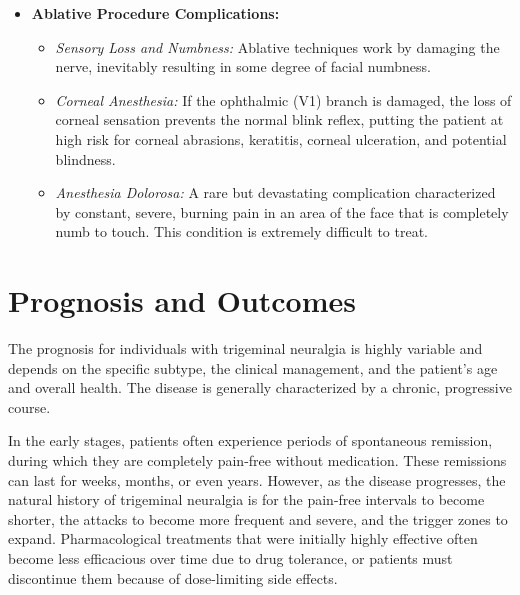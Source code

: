 \begin{itemize}
\begin{itemize}
    \item \textit{Neurological Deficits:} Microvascular decompression carries a small risk of cranial nerve injuries, resulting in permanent hearing loss (due to vestibulocochlear nerve traction), facial muscle weakness, or double vision.
    \item \textit{General Surgical Risks:} These include cerebrospinal fluid (CSF) leaks, meningitis, cerebellar stroke, hemorrhage, and risks associated with general anesthesia.
  \end{itemize}
  \item \textbf{Ablative Procedure Complications:}
  \begin{itemize}
    \item \textit{Sensory Loss and Numbness:} Ablative techniques work by damaging the nerve, inevitably resulting in some degree of facial numbness.
    \item \textit{Corneal Anesthesia:} If the ophthalmic (V1) branch is damaged, the loss of corneal sensation prevents the normal blink reflex, putting the patient at high risk for corneal abrasions, keratitis, corneal ulceration, and potential blindness.
    \item \textit{Anesthesia Dolorosa:} A rare but devastating complication characterized by constant, severe, burning pain in an area of the face that is completely numb to touch. This condition is extremely difficult to treat.
  \end{itemize}
\end{itemize}

\section*{Prognosis and Outcomes}
The prognosis for individuals with trigeminal neuralgia is highly variable and depends on the specific subtype, the clinical management, and the patient's age and overall health. The disease is generally characterized by a chronic, progressive course.

In the early stages, patients often experience periods of spontaneous remission, during which they are completely pain-free without medication. These remissions can last for weeks, months, or even years. However, as the disease progresses, the natural history of trigeminal neuralgia is for the pain-free intervals to become shorter, the attacks to become more frequent and severe, and the trigger zones to expand. Pharmacological treatments that were initially highly effective often become less efficacious over time due to drug tolerance, or patients must discontinue them because of dose-limiting side effects.

